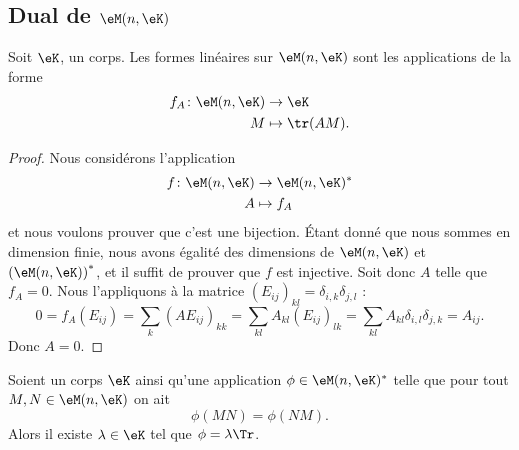 \subsection{Dual de \texorpdfstring{$ \eM(n,\eK)$}{M(n,K)}}

\begin{proposition}     \label{PropHOjJpCa}
    Soit \( \eK\), un corps. Les formes linéaires sur \( \eM(n,\eK)\) sont les applications de la forme
    \begin{equation}
        \begin{aligned}
            f_A\colon \eM(n,\eK)&\to \eK \\
            M&\mapsto \tr(AM).
        \end{aligned}
    \end{equation}
\end{proposition}


\begin{proof}
    Nous considérons l'application
    \begin{equation}
        \begin{aligned}
            f\colon \eM(n,\eK)&\to \eM(n,\eK)^* \\
            A&\mapsto f_A
        \end{aligned}
    \end{equation}
    et nous voulons prouver que c'est une bijection. Étant donné que nous sommes en dimension finie, nous avons égalité des dimensions de \( \eM(n,\eK)\) et \( \left(\eM(n,\eK)\right)^*\), et il suffit de prouver que \( f\) est injective. Soit donc \( A\) telle que \( f_A=0\). Nous l'appliquons à la matrice \( (E_{ij})_{kl}=\delta_{i,k}\delta_{j,l}\) :
    \begin{equation}
          0 = f_A(E_{ij})
            = \sum_{k}(AE_{ij})_{kk}
            = \sum_{kl}A_{kl}(E_{ij})_{lk}
            = \sum_{kl}A_{kl}\delta_{i,l}\delta_{j,k}
            = A_{ij}.
    \end{equation}
    Donc \( A=0\).
\end{proof}

\begin{corollary}
    Soient un corps \( \eK\) ainsi qu'une application \( \phi\in\eM(n,\eK)^*\) telle que pour tout \( M,N\in \eM(n,\eK)\) on ait
    \begin{equation}
        \phi(MN)=\phi(NM).
    \end{equation}
    Alors il existe \( \lambda\in \eK\) tel que \( \phi=\lambda\Tr\).
\end{corollary}

